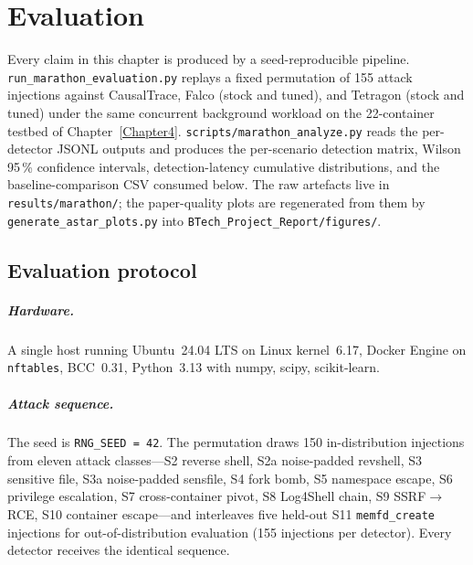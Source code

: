 \chapter{Evaluation}
\label{Chapter6}

Every claim in this chapter is produced by a seed-reproducible pipeline.
\texttt{run\_marathon\_evaluation.py} replays a fixed permutation of 155
attack injections against CausalTrace, Falco (stock and tuned), and
Tetragon (stock and tuned) under the same concurrent background workload
on the 22-container testbed of Chapter~\ref{Chapter4}.
\texttt{scripts/marathon\_analyze.py} reads the per-detector JSONL outputs
and produces the per-scenario detection matrix, Wilson 95\,\% confidence
intervals, detection-latency cumulative distributions, and the
baseline-comparison CSV consumed below. The raw artefacts live in
\texttt{results/marathon/}; the paper-quality plots are regenerated from
them by \texttt{generate\_astar\_plots.py} into
\texttt{BTech\_Project\_Report/figures/}.

\section{Evaluation protocol}
\label{sec:eval-protocol}

\paragraph{Hardware.} A single host running Ubuntu~24.04 LTS on Linux
kernel~6.17, Docker Engine on \texttt{nftables}, BCC~0.31, Python~3.13
with numpy, scipy, scikit-learn.

\paragraph{Attack sequence.} The seed is \texttt{RNG\_SEED = 42}. The
permutation draws 150 in-distribution injections from eleven attack
classes---S2 reverse shell, S2a noise-padded revshell, S3 sensitive file,
S3a noise-padded sensfile, S4 fork bomb, S5 namespace escape, S6
privilege escalation, S7 cross-container pivot, S8 Log4Shell chain, S9
SSRF$\rightarrow$RCE, S10 container escape---and interleaves five held-out
S11 \texttt{memfd\_create} injections for out-of-distribution evaluation
(155 injections per detector). Every detector receives the identical
sequence.

